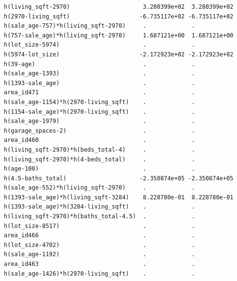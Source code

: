 \documentclass[
]{article}
\begin{document}
\begin{verbatim}
h(living_sqft-2970)                     3.280399e+02  3.280399e+02
h(2970-living_sqft)                    -6.735117e+02 -6.735117e+02
h(sale_age-757)*h(living_sqft-2970)     .             .           
h(757-sale_age)*h(living_sqft-2970)     1.687121e+00  1.687121e+00
h(lot_size-5974)                        .             .           
h(5974-lot_size)                       -2.172923e+02 -2.172923e+02
h(39-age)                               .             .           
h(sale_age-1393)                        .             .           
h(1393-sale_age)                        .             .           
area_id471                              .             .           
h(sale_age-1154)*h(2970-living_sqft)    .             .           
h(1154-sale_age)*h(2970-living_sqft)    .             .           
h(sale_age-1979)                        .             .           
h(garage_spaces-2)                      .             .           
area_id460                              .             .           
h(living_sqft-2970)*h(beds_total-4)     .             .           
h(living_sqft-2970)*h(4-beds_total)     .             .           
h(age-100)                              .             .           
h(4.5-baths_total)                     -2.350874e+05 -2.350874e+05
h(sale_age-552)*h(living_sqft-2970)     .             .           
h(1393-sale_age)*h(living_sqft-3284)    8.228780e-01  8.228780e-01
h(1393-sale_age)*h(3284-living_sqft)    .             .           
h(living_sqft-2970)*h(baths_total-4.5)  .             .           
h(lot_size-8517)                        .             .           
area_id466                              .             .           
h(lot_size-4702)                        .             .           
h(sale_age-1192)                        .             .           
area_id463                              .             .           
h(sale_age-1426)*h(2970-living_sqft)    .             .           
                                                                  

\end{verbatim}
\end{document}
